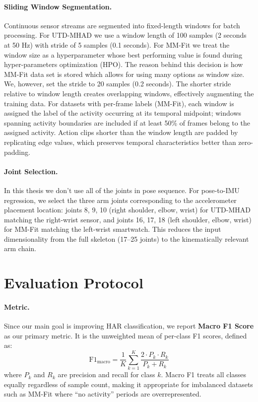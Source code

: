 \paragraph{Sliding Window Segmentation.}
Continuous sensor streams are segmented into fixed-length windows for batch processing. For UTD-MHAD we use a window length of 100 samples (2 seconds at 50 Hz) with stride of 5 samples (0.1 seconds). For MM-Fit we treat the window size as a hyperparameter whose best performing value is found during hyper-parameters optimization (HPO). The reason behind this decision is how MM-Fit data set is stored which allows for using many options as window size. We, however, set the stride to 20 samples (0.2 seconds). The shorter stride relative to window length creates overlapping windows, effectively augmenting the training data. For datasets with per-frame labels (MM-Fit), each window is assigned the label of the activity occurring at its temporal midpoint; windows spanning activity boundaries are included if at least 50\% of frames belong to the assigned activity. Action clips shorter than the window length are padded by replicating edge values, which preserves temporal characteristics better than zero-padding.

\paragraph{Joint Selection.}
In this thesis we don't use all of the joints in pose sequence. For pose-to-IMU regression, we select the three arm joints corresponding to the accelerometer placement location: joints 8, 9, 10 (right shoulder, elbow, wrist) for UTD-MHAD matching the right-wrist sensor, and joints 16, 17, 18 (left shoulder, elbow, wrist) for MM-Fit matching the left-wrist smartwatch. This reduces the input dimensionality from the full skeleton (17--25 joints) to the kinematically relevant arm chain.

\section{Evaluation Protocol}
\label{sec:evaluation-protocol}

\paragraph{Metric.}
Since our main goal is improving HAR classification, we report \textbf{Macro F1 Score} as our primary metric. It is the unweighted mean of per-class F1 scores, defined as:
\begin{equation}
    \text{F1}_{\text{macro}} = \frac{1}{K} \sum_{k=1}^{K} \frac{2 \cdot P_k \cdot R_k}{P_k + R_k}
\end{equation}
where $P_k$ and $R_k$ are precision and recall for class $k$. Macro F1 treats all classes equally regardless of sample count, making it appropriate for imbalanced datasets such as MM-Fit where ``no activity'' periods are overrepresented.


